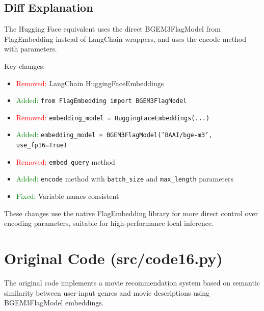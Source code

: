 \documentclass[11pt, a4paper]{article}
\begin{document}
\subsection{Diff Explanation}

The Hugging Face equivalent uses the direct BGEM3FlagModel from FlagEmbedding instead of LangChain wrappers, and uses the encode method with parameters.

Key changes:
\begin{itemize}
    \item \textcolor{red}{Removed:} LangChain HuggingFaceEmbeddings
    \item \textcolor{green}{Added:} \texttt{from FlagEmbedding import BGEM3FlagModel}
    \item \textcolor{red}{Removed:} \texttt{embedding\_model = HuggingFaceEmbeddings(...)}
    \item \textcolor{green}{Added:} \texttt{embedding\_model = BGEM3FlagModel('BAAI/bge-m3', use\_fp16=True)}
    \item \textcolor{red}{Removed:} \texttt{embed\_query} method
    \item \textcolor{green}{Added:} \texttt{encode} method with \texttt{batch\_size} and \texttt{max\_length} parameters
    \item \textcolor{green}{Fixed:} Variable names consistent
\end{itemize}

These changes use the native FlagEmbedding library for more direct control over encoding parameters, suitable for high-performance local inference.


\newpage
\section{Original Code (src/code16.py)}

The original code implements a movie recommendation system based on semantic similarity between user-input genres and movie descriptions using BGEM3FlagModel embeddings.
\end{document}
